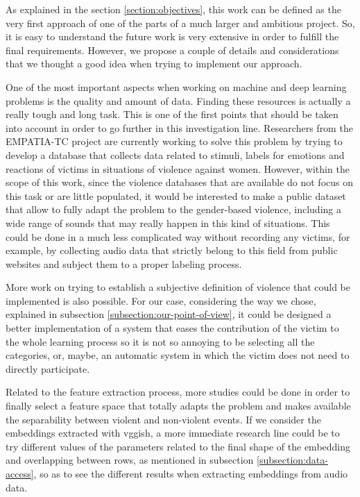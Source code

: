 
	As explained in the section \ref{section:objectives}, this work can be defined as the very first approach of one of the parts of a much larger and ambitious project. So, it is easy to understand the future work is very extensive in order to fulfill the final requirements. However, we propose a couple of details and considerations that we thought a good idea when trying to implement our approach.
	
	One of the most important aspects when working on machine and deep learning problems is the quality and amount of data. Finding these resources is actually a really tough and long task. This is one of the first points that should be taken into account in order to go further in this investigation line. Researchers from the EMPATIA-TC project are currently working to solve this problem by trying to develop a database that collects data related to stimuli, labels for emotions and reactions of victims \cite{UC3M4SafetyTeam2018} in situations of violence against women. However, within the scope of this work, since the violence databases that are available do not focus on this task or are little populated, it would be interested to make a public dataset that allow to fully adapt the problem to the gender-based violence, including a wide range of sounds that may really happen in this kind of situations. This could be done in a much less complicated way without recording any victims, for example, by collecting audio data that strictly belong to this field from public websites and subject them to a proper labeling process.
	
	More work on trying to establish a subjective definition of violence that could be implemented is also possible. For our case, considering the way we chose, explained in subsection \ref{subsection:our-point-of-view}, it could be designed a better implementation of a system that eases the contribution of the victim to the whole learning process so it is not so annoying to be selecting all the categories, or, maybe, an automatic system in which the victim does not need to directly participate.
	
	Related to the feature extraction process, more studies could be done in order to finally select a feature space that totally adapts the problem and makes available the separability between violent and non-violent events. If we consider the embeddings extracted with \acrshort{vgg}ish, a more immediate research line could be to try different values of the parameters related to the final shape of the embedding and overlapping between rows, as mentioned in subsection \ref{subsection:data-access}, so as to see the different results when extracting embeddings from audio data.
	
